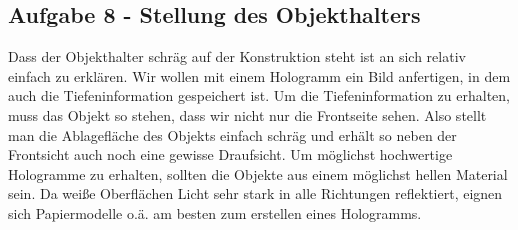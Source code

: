 \subsection*{Aufgabe 8 - Stellung des Objekthalters}
Dass der Objekthalter schräg auf der Konstruktion steht ist an sich relativ einfach zu erklären. Wir wollen mit einem Hologramm ein Bild anfertigen, in dem auch die Tiefeninformation gespeichert ist. Um die Tiefeninformation zu erhalten, muss das Objekt so stehen, dass wir nicht nur die Frontseite sehen. Also stellt man die Ablagefläche des Objekts einfach schräg und erhält so neben der Frontsicht auch noch eine gewisse Draufsicht. Um möglichst hochwertige Hologramme zu erhalten, sollten die Objekte aus einem  möglichst hellen Material sein. Da weiße Oberflächen Licht sehr stark in alle Richtungen reflektiert, eignen sich Papiermodelle o.ä. am besten zum erstellen eines Hologramms.